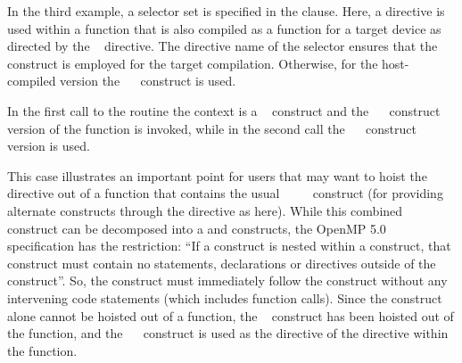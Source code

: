 

\clearpage

In the third example, a  selector set is specified in the  clause.  
Here, a  directive is used within a function that is also
compiled as a function for a target device as directed by the ~ directive.
The  directive name of the  selector ensures that the
~~ construct is employed for the target compilation.
Otherwise, for the host-compiled version the ~~ construct is used.

In the first call to the  routine the context is a
~ construct and the ~~
construct version of the function is invoked,
while in the second call the ~~ construct version is used.

This case illustrates an important point for users that may want to hoist the 
 directive out of a function that contains the usual 
~~~~ construct
(for providing alternate constructs through the  directive as here).
While this combined construct can be decomposed into a  and
 constructs, the OpenMP 5.0 specification has the restriction:
``If a  construct is nested within a  construct, that  construct must
contain no statements, declarations or directives outside of the  construct''.
So, the  construct must immediately follow the  construct without any intervening
code statements (which includes function calls).  
Since the  construct alone cannot be hoisted out of a function, 
the ~ construct has been hoisted out of the function, and the 
~~ construct is used
as the  directive of the  directive within the function.



